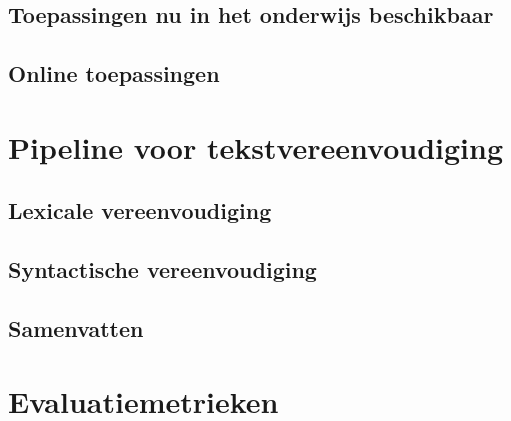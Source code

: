\subsection{Toepassingen nu in het onderwijs beschikbaar}

\subsection{Online toepassingen}

\section{Pipeline voor tekstvereenvoudiging}


\subsection{Lexicale vereenvoudiging}

\subsection{Syntactische vereenvoudiging}

\subsection{Samenvatten}

\section{Evaluatiemetrieken}




